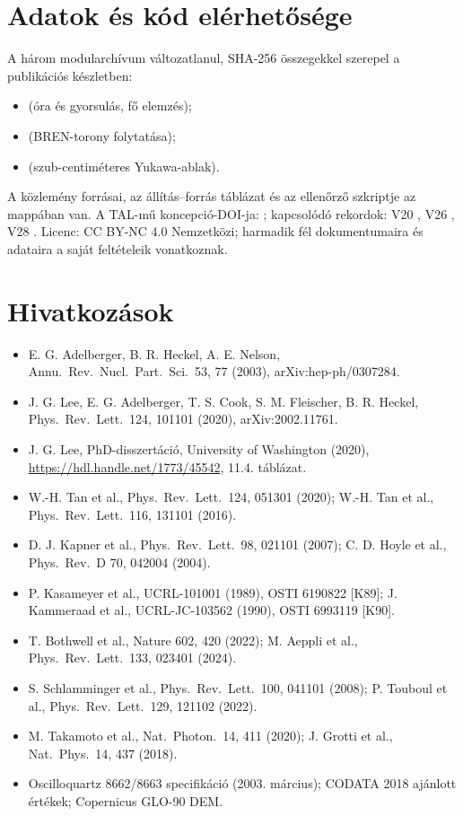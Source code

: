 \documentclass[11pt,a4paper]{article}
\begin{document}
\section*{Adatok és kód elérhetősége}\label{sec:avail}
A három modularchívum változatlanul, SHA-256 összegekkel szerepel a publikációs készletben:
\begin{itemize}\setlength{\itemsep}{0pt}
\item {} (óra és gyorsulás, fő elemzés);
\item {} (BREN-torony folytatása);
\item {} (szub-centiméteres Yukawa-ablak).
\end{itemize}
A közlemény forrásai, az állítás--forrás táblázat és az ellenőrző szkriptje az  mappában van. A TAL-mű koncepció-DOI-ja:
; kapcsolódó rekordok: V20 , V26 ,
V28 . Licenc: CC BY-NC 4.0 Nemzetközi; harmadik fél dokumentumaira és adataira a saját feltételeik vonatkoznak.

\section*{Hivatkozások}
\footnotesize
\begin{itemize}\setlength{\itemsep}{0pt}
\item E. G. Adelberger, B. R. Heckel, A. E. Nelson, Annu.\ Rev.\ Nucl.\ Part.\ Sci.\ 53, 77 (2003), arXiv:hep-ph/0307284.
\item J. G. Lee, E. G. Adelberger, T. S. Cook, S. M. Fleischer, B. R. Heckel, Phys.\ Rev.\ Lett.\ 124, 101101 (2020), arXiv:2002.11761.
\item J. G. Lee, PhD-disszertáció, University of Washington (2020), \url{https://hdl.handle.net/1773/45542}, 11.4. táblázat.
\item W.-H. Tan et al., Phys.\ Rev.\ Lett.\ 124, 051301 (2020); W.-H. Tan et al., Phys.\ Rev.\ Lett.\ 116, 131101 (2016).
\item D. J. Kapner et al., Phys.\ Rev.\ Lett.\ 98, 021101 (2007); C. D. Hoyle et al., Phys.\ Rev.\ D 70, 042004 (2004).
\item P. Kasameyer et al., UCRL-101001 (1989), OSTI 6190822 [K89]; J. Kammeraad et al., UCRL-JC-103562 (1990), OSTI 6993119 [K90].
\item T. Bothwell et al., Nature 602, 420 (2022); M. Aeppli et al., Phys.\ Rev.\ Lett.\ 133, 023401 (2024).
\item S. Schlamminger et al., Phys.\ Rev.\ Lett.\ 100, 041101 (2008); P. Touboul et al., Phys.\ Rev.\ Lett.\ 129, 121102 (2022).
\item M. Takamoto et al., Nat.\ Photon.\ 14, 411 (2020); J. Grotti et al., Nat.\ Phys.\ 14, 437 (2018).
\item Oscilloquartz 8662/8663 specifikáció (2003. március); CODATA 2018 ajánlott értékek; Copernicus GLO-90 DEM.
\end{itemize}
\end{document}
